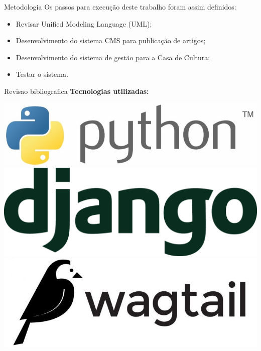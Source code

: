 \begin{frame}{Metodologia}
Os passos para execução deste trabalho foram assim definidos:

\begin{itemize}
  \item Revisar Unified Modeling Language (UML);
  \item Desenvolvimento do sistema CMS para publicação de artigos; \item Desenvolvimento do sistema de gestão para a Casa de Cultura;
  \item Testar o sistema.
\end{itemize}
\end{frame}

\begin{frame}{Revisao bibliografica}
\textbf{Tecnologias utilizadas:}

\vspace{\baselineskip}

\begin{center}
  \includegraphics[height=0.2\textheight]{beamerthemesrc/assets/python.jpg}
  \includegraphics[height=0.2\textheight]{beamerthemesrc/assets/django-logo-positive.png}
  \includegraphics[height=0.2\textheight]{beamerthemesrc/assets/wagtail4298.jpg}
\end{center}
  
  \end{frame}

